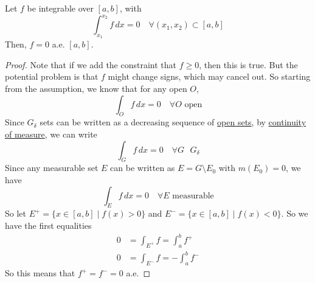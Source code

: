   \begin{lemma}
    \label{thm:vanishing-integral-over-all-subintervals}
    Let $f$ be integrable over $[a, b]$, with 
    \begin{equation}
      \int_{x_1}^{x_2} f\, dx = 0 \quad \forall (x_1, x_2) \subset [a, b]
    \end{equation}
    Then, $f = 0$ a.e. $[a, b]$. 
  \end{lemma}
  \begin{proof}
    Note that if we add the constraint that $f \geq 0$, then this is true. But the potential problem is that $f$ might change signs, which may cancel out. So starting from the assumption, we know that for any open $O$, 
    \begin{equation}
      \int_O f \,dx = 0 \quad \forall O \text{ open} 
    \end{equation}
    Since $G_\delta$ sets can be written as a decreasing sequence of \hyperref[pst-def:open-set]{open sets}, by \hyperref[thm:continuity-of-measure]{continuity of measure}, we can write 
    \begin{equation}
      \int_G f \,dx = 0 \quad \forall G \text{ } G_\delta
    \end{equation}
    Since any measurable set $E$ can be written as $E = G \setminus E_0$ with $m(E_0) = 0$, we have 
    \begin{equation}
      \int_E f \,dx = 0 \quad \forall E \text{ measurable}
    \end{equation}
    So let $E^+ = \{ x \in [a, b] \mid f(x) > 0\}$ and $E^- = \{ x \in [a, b] \mid f(x) < 0\}$. So we have the first equalities
    \begin{align}
      0 & = \int_{E^+} f = \int_a^b f^+ \\
      0 & = \int_{E^-} f = - \int_a^b f^-  
    \end{align}
    So this means that $f^+ = f^- = 0$ a.e. 
  \end{proof}

